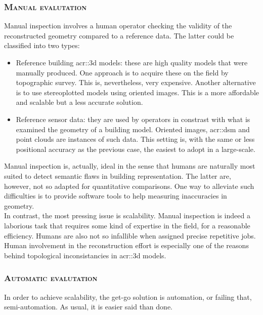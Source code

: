         \subsubsection{\textsc{Manual evalutation}}
            Manual inspection involves a human operator checking the validity of the reconstructed geometry compared to a reference data.
            The latter could be classified into two types:
            \begin{itemize}
                \item Reference building \gls{acr::3d} models: these are high quality models that were manually produced.
                    One approach is to acquire these on the field by topographic survey.
                    This is, nevertheless, very expensive.
                    Another alternative is to use stereoplotted models using oriented images.
                    This is a more affordable and scalable but a less accurate solution.
                \item Reference sensor data: they are used by operators in constrast with what is examined the geometry of a building model.
                    Oriented images, \gls{acr::dsm} and point clouds are instances of such data.
                    This setting is, with the same or less positional accuracy as the previous case, the easiest to adopt in a large-scale.
            \end{itemize}

            Manual inspection is, actually, ideal in the sense that humans are naturally most suited to detect semantic flaws in building representation.
            The latter are, however, not so adapted for quantitative comparisons.
            One way to alleviate such difficulties is to provide software tools to help measuring inaccuracies in geometry\addref.\\

            In contrast, the most pressing issue is scalability.
            Manual inspection is indeed a laborious task that requires some kind of expertise in the field, for a reasonable efficiency.
            Humans are also not so infallible when assigned precise repetitive jobs.
            Human involvement in the reconstruction effort is especially one of the reasons behind topological inconsistancies in \gls{acr::3d} models.

        \subsubsection{\textsc{Automatic evalutation}}
            In order to achieve scalability, the get-go solution is automation, or failing that, semi-automation.
            As usual, it is easier said than done.\\

